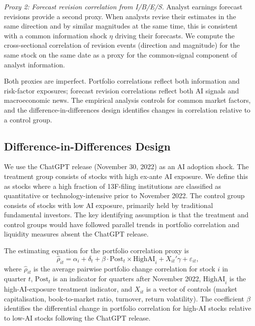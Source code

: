 \emph{Proxy 2: Forecast revision correlation from I/B/E/S.} Analyst earnings forecast revisions provide a second proxy. When analysts revise their estimates in the same direction and by similar magnitudes at the same time, this is consistent with a common information shock $\eta$ driving their forecasts. We compute the cross-sectional correlation of revision events (direction and magnitude) for the same stock on the same date as a proxy for the common-signal component of analyst information.

Both proxies are imperfect. Portfolio correlations reflect both information and risk-factor exposures; forecast revision correlations reflect both AI signals and macroeconomic news. The empirical analysis controls for common market factors, and the difference-in-differences design identifies changes in correlation relative to a control group.

\subsection{Difference-in-Differences Design}

We use the ChatGPT release (November 30, 2022) as an AI adoption shock. The treatment group consists of stocks with high ex-ante AI exposure. We define this as stocks where a high fraction of 13F-filing institutions are classified as quantitative or technology-intensive prior to November 2022. The control group consists of stocks with low AI exposure, primarily held by traditional fundamental investors. The key identifying assumption is that the treatment and control groups would have followed parallel trends in portfolio correlation and liquidity measures absent the ChatGPT release.

The estimating equation for the portfolio correlation proxy is
\begin{equation}\label{eq:did-correlation}
  \hat{\rho}_{it} = \alpha_i + \delta_t + \beta \cdot \text{Post}_t \times \text{HighAI}_i + X_{it}'\gamma + \varepsilon_{it},
\end{equation}
where $\hat{\rho}_{it}$ is the average pairwise portfolio change correlation for stock $i$ in quarter $t$, $\text{Post}_t$ is an indicator for quarters after November 2022, $\text{HighAI}_i$ is the high-AI-exposure treatment indicator, and $X_{it}$ is a vector of controls (market capitalisation, book-to-market ratio, turnover, return volatility). The coefficient $\beta$ identifies the differential change in portfolio correlation for high-AI stocks relative to low-AI stocks following the ChatGPT release.

